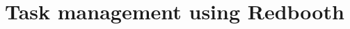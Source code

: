 \documentclass{tufte-book} %
\begin{document}








\section{Task management using Redbooth}
\end{document}
